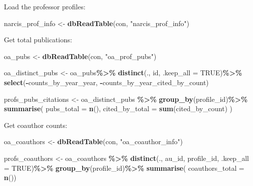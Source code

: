 \documentclass[
]{article}
\newenvironment{Shaded}{\begin{snugshade}}{\end{snugshade}}
\newcommand{\AttributeTok}[1]{\textcolor[rgb]{0.13,0.29,0.53}{#1}}
\newcommand{\ConstantTok}[1]{\textcolor[rgb]{0.56,0.35,0.01}{#1}}
\newcommand{\FunctionTok}[1]{\textcolor[rgb]{0.13,0.29,0.53}{\textbf{#1}}}
\newcommand{\NormalTok}[1]{#1}
\newcommand{\OtherTok}[1]{\textcolor[rgb]{0.56,0.35,0.01}{#1}}
\newcommand{\SpecialCharTok}[1]{\textcolor[rgb]{0.81,0.36,0.00}{\textbf{#1}}}
\newcommand{\StringTok}[1]{\textcolor[rgb]{0.31,0.60,0.02}{#1}}
\begin{document}
Load the professor profiles:

\begin{Shaded}
\begin{Highlighting}[]
\NormalTok{narcis\_prof\_info }\OtherTok{\textless{}{-}} \FunctionTok{dbReadTable}\NormalTok{(con, }\StringTok{"narcis\_prof\_info"}\NormalTok{)}
\end{Highlighting}
\end{Shaded}

Get total publications:

\begin{Shaded}
\begin{Highlighting}[]
\NormalTok{oa\_pubs }\OtherTok{\textless{}{-}} \FunctionTok{dbReadTable}\NormalTok{(con, }\StringTok{"oa\_prof\_pubs"}\NormalTok{)}

\NormalTok{oa\_distinct\_pubs }\OtherTok{\textless{}{-}}\NormalTok{ oa\_pubs}\SpecialCharTok{\%\textgreater{}\%}
  \FunctionTok{distinct}\NormalTok{(., id, }\AttributeTok{.keep\_all =} \ConstantTok{TRUE}\NormalTok{)}\SpecialCharTok{\%\textgreater{}\%}
    \FunctionTok{select}\NormalTok{(}\SpecialCharTok{{-}}\NormalTok{counts\_by\_year\_year, }\SpecialCharTok{{-}}\NormalTok{counts\_by\_year\_cited\_by\_count)}

\NormalTok{profs\_pubs\_citations }\OtherTok{\textless{}{-}}\NormalTok{ oa\_distinct\_pubs }\SpecialCharTok{\%\textgreater{}\%}
  \FunctionTok{group\_by}\NormalTok{(profile\_id)}\SpecialCharTok{\%\textgreater{}\%}
  \FunctionTok{summarise}\NormalTok{(}
    \AttributeTok{pubs\_total =} \FunctionTok{n}\NormalTok{(),}
    \AttributeTok{cited\_by\_total =} \FunctionTok{sum}\NormalTok{(cited\_by\_count)}
\NormalTok{  )}
\end{Highlighting}
\end{Shaded}

Get coauthor counts:

\begin{Shaded}
\begin{Highlighting}[]
\NormalTok{oa\_coauthors }\OtherTok{\textless{}{-}} \FunctionTok{dbReadTable}\NormalTok{(con, }\StringTok{"oa\_coauthor\_info"}\NormalTok{)}

\NormalTok{profs\_coauthors }\OtherTok{\textless{}{-}}\NormalTok{ oa\_coauthors }\SpecialCharTok{\%\textgreater{}\%}
  \FunctionTok{distinct}\NormalTok{(., au\_id, profile\_id, }\AttributeTok{.keep\_all =} \ConstantTok{TRUE}\NormalTok{)}\SpecialCharTok{\%\textgreater{}\%}
  \FunctionTok{group\_by}\NormalTok{(profile\_id)}\SpecialCharTok{\%\textgreater{}\%}
  \FunctionTok{summarise}\NormalTok{(}
    \AttributeTok{coauthors\_total =} \FunctionTok{n}\NormalTok{())}
\end{Highlighting}
\end{Shaded}
\end{document}
